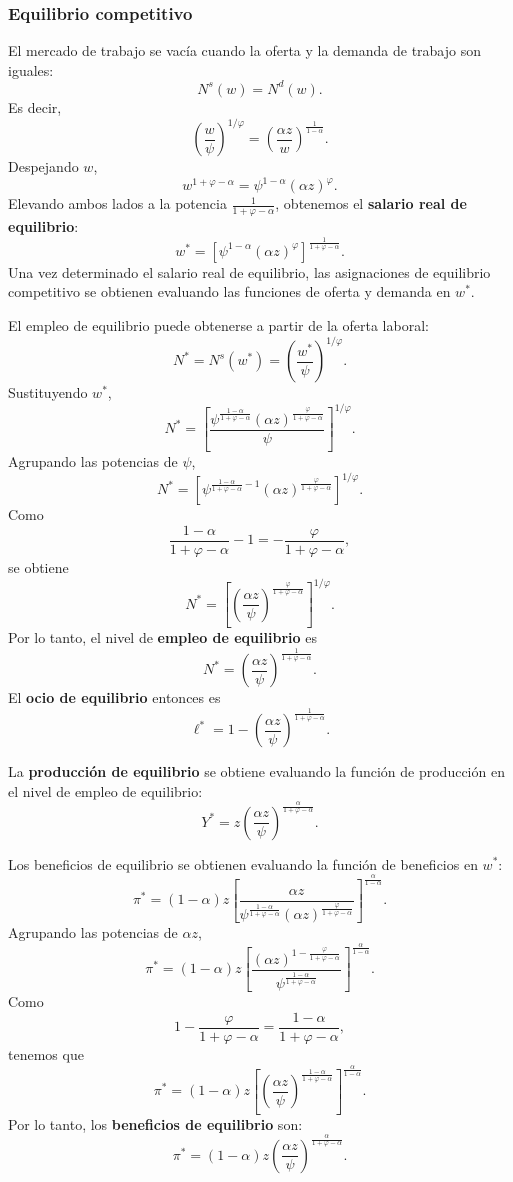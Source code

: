\documentclass[11pt]{article}
\begin{document}
\subsubsection*{Equilibrio competitivo}

El mercado de trabajo se vacía cuando la oferta y la demanda de trabajo son iguales:
\[
N^s(w)=N^d(w).
\]
Es decir,
\[
\left(\frac{w}{\psi}\right)^{1/\varphi}
=
\left(
\frac{\alpha z}{w}
\right)^{\frac{1}{1-\alpha}}.
\]
Despejando $w$,
\[
w^{1+\varphi-\alpha}
=
\psi^{1-\alpha}(\alpha z)^\varphi.
\]
Elevando ambos lados a la potencia $\frac{1}{1+\varphi-\alpha}$, obtenemos el \textbf{salario real de equilibrio}:
\[
\boxed{
w^*
=
\left[
\psi^{1-\alpha}(\alpha z)^\varphi
\right]^{\frac{1}{1+\varphi-\alpha}}
}.
\]
Una vez determinado el salario real de equilibrio, las asignaciones de equilibrio competitivo se obtienen evaluando las funciones de oferta y demanda en $w^*$.

El empleo de equilibrio puede obtenerse a partir de la oferta laboral:
\[
N^*
=
N^s(w^*)
=
\left(
\frac{w^*}{\psi}
\right)^{1/\varphi}.
\]
Sustituyendo $w^*$,
\[
N^*
=
\left[
\frac{
\psi^{\frac{1-\alpha}{1+\varphi-\alpha}}
(\alpha z)^{\frac{\varphi}{1+\varphi-\alpha}}
}{
\psi
}
\right]^{1/\varphi}.
\]
Agrupando las potencias de $\psi$,
\[
N^*
=
\left[
\psi^{
\frac{1-\alpha}{1+\varphi-\alpha}-1
}
(\alpha z)^{
\frac{\varphi}{1+\varphi-\alpha}
}
\right]^{1/\varphi}.
\]
Como
\[
\frac{1-\alpha}{1+\varphi-\alpha}-1
=
-\frac{\varphi}{1+\varphi-\alpha},
\]
se obtiene
\[
N^*
=
\left[
\left(
\frac{\alpha z}{\psi}
\right)^{
\frac{\varphi}{1+\varphi-\alpha}
}
\right]^{1/\varphi}.
\]
Por lo tanto, el nivel de \textbf{empleo de equilibrio} es
\[
\boxed{
N^*
=
\left(
\frac{\alpha z}{\psi}
\right)^{\frac{1}{1+\varphi-\alpha}}
}.
\]
El \textbf{ocio de equilibrio} entonces es
\[
\boxed{
\ell^*
=
1-
\left(
\frac{\alpha z}{\psi}
\right)^{\frac{1}{1+\varphi-\alpha}}
}.
\]

La \textbf{producción de equilibrio} se obtiene evaluando la función de producción en el nivel de empleo de equilibrio:
\[
\boxed{
Y^*
=
z
\left(
\frac{\alpha z}{\psi}
\right)^{\frac{\alpha}{1+\varphi-\alpha}}
}.
\]

Los beneficios de equilibrio se obtienen evaluando la función de beneficios en $w^*$:
\[
\pi^*
=
(1-\alpha)z
\left[
\frac{
\alpha z
}{
\psi^{\frac{1-\alpha}{1+\varphi-\alpha}}
(\alpha z)^{\frac{\varphi}{1+\varphi-\alpha}}
}
\right]^{\frac{\alpha}{1-\alpha}}.
\]
Agrupando las potencias de $\alpha z$,
\[
\pi^*
=
(1-\alpha)z
\left[
\frac{
(\alpha z)^{
1-\frac{\varphi}{1+\varphi-\alpha}
}
}{
\psi^{\frac{1-\alpha}{1+\varphi-\alpha}}
}
\right]^{\frac{\alpha}{1-\alpha}}.
\]
Como
\[
1-\frac{\varphi}{1+\varphi-\alpha}
=
\frac{1-\alpha}{1+\varphi-\alpha},
\]
tenemos que
\[
\pi^*
=
(1-\alpha)z
\left[
\left(
\frac{\alpha z}{\psi}
\right)^{
\frac{1-\alpha}{1+\varphi-\alpha}
}
\right]^{\frac{\alpha}{1-\alpha}}.
\]
Por lo tanto, los \textbf{beneficios de equilibrio} son:
\[
\boxed{
\pi^*
=
(1-\alpha)z
\left(
\frac{\alpha z}{\psi}
\right)^{\frac{\alpha}{1+\varphi-\alpha}}
}.
\]
\end{document}
